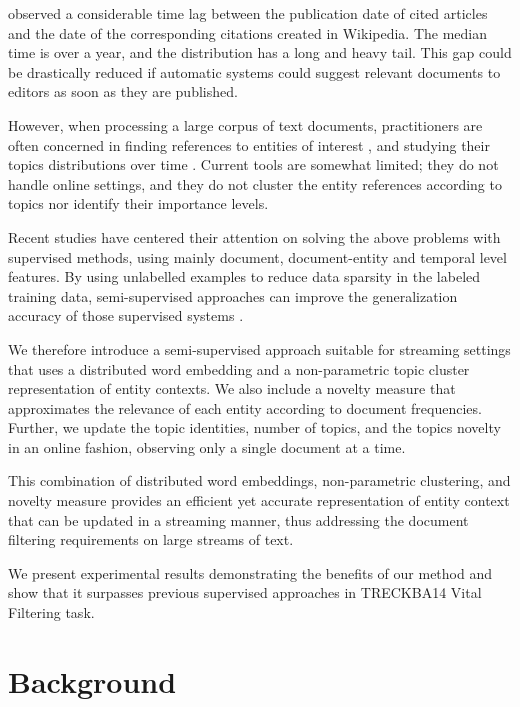 \documentclass{article}
\begin{document}
\cite{frank12} observed a considerable time lag between the publication date of cited articles and the date of the corresponding citations created in Wikipedia. The median time is over a year, and the distribution has a long and heavy tail. This gap could be drastically reduced if automatic systems could suggest relevant documents to editors as soon as they are published.

However, when processing a large corpus of text documents, practitioners are often concerned in finding references to entities of interest \cite{RaoMD10, choi2007}, and studying their topics distributions over time \cite{blei12}. Current tools are somewhat limited; they do not handle online settings, and they do not cluster the entity references according to topics nor identify their importance levels.

Recent studies \cite{xitong13, bouvier13, efron13, zhang13, bellogin13} have centered their attention on solving the above problems with supervised methods, using mainly document, document-entity and temporal level features. By using unlabelled examples to reduce data sparsity in the labeled training data, semi-supervised approaches can improve the generalization accuracy of those supervised systems \cite{Turian10wordrepresentations}.

We therefore introduce a semi-supervised approach suitable for streaming settings that uses a distributed word embedding and a non-parametric topic cluster representation of entity contexts. We also include a novelty measure that approximates the relevance of each entity according to document frequencies. Further, we update the topic identities, number of topics, and the topics novelty in an online fashion, observing only a single document at a time.

This combination of distributed word embeddings, non-parametric clustering, and novelty measure provides an efficient yet accurate representation of entity context that can be updated in a streaming manner, thus addressing the document filtering requirements on large streams of text.

We present experimental results demonstrating the benefits of our method and show that it surpasses previous supervised approaches in TRECKBA14 Vital Filtering task.

\section{Background}
\label{background} 
\end{document}
